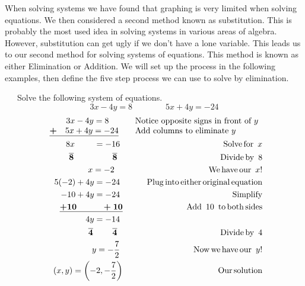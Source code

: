 {}\pp

When solving systems we have found that graphing is very limited when solving
equations. We then considered a second method known as substitution. This is
probably the most used idea in solving systems in various areas of algebra.
However, substitution can get ugly if we don't have a lone variable. This
leads us to our second method for solving systems of equations. This method is
known as either Elimination or Addition. We will set up the process in the
following examples, then define the five step process we can use to solve by
elimination.

\begin{example}~~~Solve the following system of equations.
      $$3 x - 4 y = 8\qquad\qquad 5 x + 4 y = - 24$$
\begin{eqnarray*}
    \begin{array}{l}
      ~~~~~~3 x - 4 y = 8\\
      \underline{\tmmathbf{+}~~~5 x + 4 y = - 24}
    \end{array} &  & \begin{array}{l}
      \text{Notice~opposite~signs~in~front~of~} y\\
			\text{Add~columns~to~eliminate~} y
    \end{array}\\ %
    8 x ~~~~~~~= - 16~ &  & \tmop{~Solve} \tmop{for~} x\\
    \tmmathbf{\overline{8} ~~~~~~~~~~~~~~ \overline{8}}~~  &  & \tmop{~Divide} \tmop{by~} 8\\
    x = - 2~~~ &  & \tmop{~We} \tmop{have} \tmop{our~} x!\\
    5 (- 2) + 4 y = - 24~ &  & \tmop{~Plug} \tmop{into} \tmop{either}
    \tmop{original} \tmop{equation}\\
    - 10 + 4 y = - 24~ &  &\tmop{~Simplify}\\
    \tmmathbf{\underline{+ 10 ~~~~~~~~~+ 10}} &  &  \tmop{~Add~} 10 \tmop{~to} \tmop{both} \tmop{sides}\\
    4 y = - 14~ &  & \\
    \tmmathbf{\overline{4} ~~~~~~~ \overline{4}}~~  &  & \tmop{~Divide} \tmop{by~} 4\\
    y = -\frac{7}{2}~ &  & \tmop{~Now} \tmop{we} \tmop{have} \tmop{our~} y!\\
    (x,y)=\left( - 2, -\frac{7}{2} \right) &  & \tmop{~Our} \tmop{solution}
  \end{eqnarray*}
\end{example}
  


